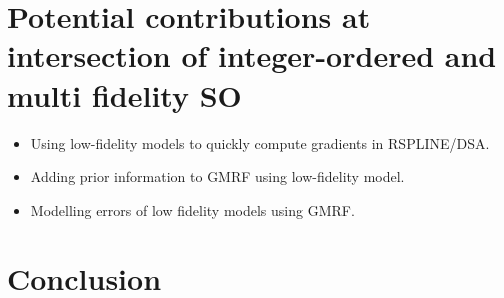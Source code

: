 \documentclass{article}
\begin{document}
\section{Potential contributions at intersection of integer-ordered and multi fidelity SO} \label{mfso}

\begin{itemize}[noitemsep]
\item Using low-fidelity models to quickly compute gradients in RSPLINE/DSA.
\item Adding prior information to GMRF using low-fidelity model.
\item Modelling errors of low fidelity models using GMRF.
\end{itemize}

\section{Conclusion}\label{conc}

\newpage



\end{document}
